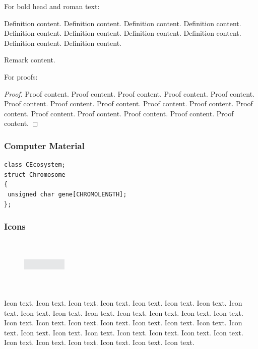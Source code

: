 For bold head and roman text:

\begin{definition}
Definition content. Definition content. Definition content.
Definition content. Definition content. Definition content. 
Definition content. 
Definition content. 
Definition content. 
Definition content. 
\end{definition}

\begin{remark}
Remark content. 
\end{remark}

For proofs:

\begin{proof}
Proof content. Proof content. Proof content. Proof content. Proof content. Proof content. Proof content. Proof content. Proof content. Proof content. Proof content. Proof content. Proof content. Proof content. Proof content. Proof content. 
\end{proof}

\subsubsection*{Computer Material}

\begin{verbatim}
class CEcosystem;
struct Chromosome
{
 unsigned char gene[CHROMOLENGTH];
};
\end{verbatim}

\clearpage

\subsubsection*{Icons}

\begin{figure}
\vspace*{-24pt}
\includegraphics[width=5pc,height=6pc]{01.eps}%
\end{figure}
Icon text. Icon text. Icon text. Icon text. Icon text. Icon text. Icon text. Icon text. Icon text. Icon text. Icon text. Icon text. Icon text. Icon text. Icon text. Icon text. Icon text. Icon text. Icon text. Icon text. Icon text. Icon text. Icon text. Icon text. Icon text. Icon text. Icon text. Icon text. Icon text. Icon text. Icon text. Icon text. Icon text. Icon text. Icon text. Icon text. 

